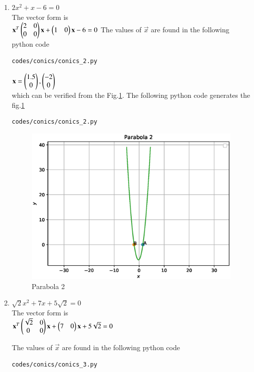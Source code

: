 \begin{enumerate}[label=\arabic*.,ref=\thesubsection.\theenumi]
\begin{enumerate}
\item $2x^2+x-6=0$ \\
The vector form is  \\
$\mathbf{x}^T\begin{pmatrix}2&0\\0&0\end{pmatrix}\mathbf{x}+\begin{pmatrix}1&0\end{pmatrix}\mathbf{x}-6
=0$
The values of $\vec{x}$ are found in the following python code
\begin{lstlisting}
codes/conics/conics_2.py
\end{lstlisting}

$\mathbf{x}=\begin{pmatrix}1.5\\0\end{pmatrix}, \begin{pmatrix}-2\\0\end{pmatrix}$ \\
which can be verified from the Fig.\ref{fig:parabola_2}.
The following python code generates the fig.\ref{fig:parabola_2}
\begin{lstlisting}
codes/conics/conics_2.py
\end{lstlisting}
\begin{figure}[!ht]
\includegraphics[width=\columnwidth]{./codes/conics/conics_2.eps}
\caption{Parabola 2}
\label{fig:parabola_2}
\end{figure} 

\item $\sqrt{2}x^2+7x+5\sqrt{2}=0$ \\
The vector form is  \\
$\mathbf{x}^T\begin{pmatrix}\sqrt{2}&0\\0&0\end{pmatrix}\mathbf{x}+\begin{pmatrix}7&0\end{pmatrix}\mathbf{x}+5\sqrt{2}=0$
 
The values of $\vec{x}$ are found in the following python code
\begin{lstlisting}
codes/conics/conics_3.py
\end{lstlisting}


\end{enumerate}
\end{enumerate}

